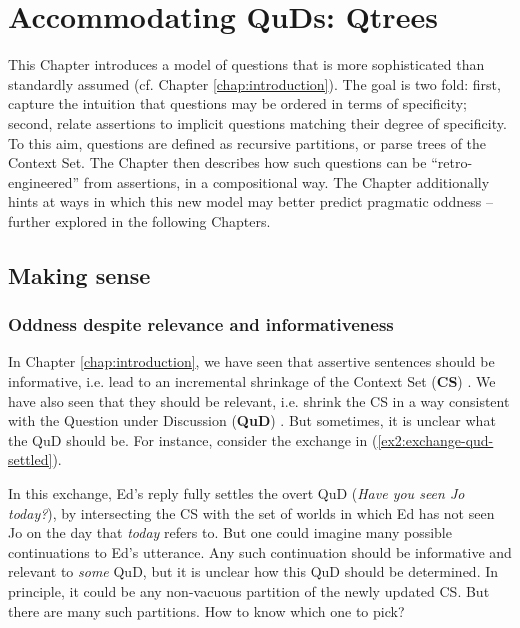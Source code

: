 \chapter{Accommodating QuDs: Qtrees}\label{chap:accommodating-quds}

This Chapter introduces a model of questions that is more sophisticated than standardly assumed (cf. Chapter \ref{chap:introduction}). The goal is two fold: first, capture the intuition that questions may be ordered in terms of specificity; second, relate assertions to implicit questions matching their degree of specificity. To this aim, questions are defined as recursive partitions, or parse trees of the Context Set. The Chapter then describes how such questions can be ``retro-engineered'' from assertions, in a compositional way. The Chapter additionally hints at ways in which this new model may better predict pragmatic oddness -- further explored in the following Chapters.


\section{Making sense}

\subsection{Oddness despite relevance and informativeness}
In Chapter \ref{chap:introduction}, we have seen that assertive sentences should be informative, i.e. lead to an incremental shrinkage of the Context Set (\textbf{CS}) \citep{Stalnaker1978,Heim1982}. We have also seen that they should be relevant, i.e. shrink the CS in a way consistent with the Question under Discussion (\textbf{QuD}) \citep{Lewis1988,Roberts2012}. But sometimes, it is unclear what the QuD should be. For instance, consider the exchange in (\ref{ex2:exchange-qud-settled}).

\begin{exe}
	\label{ex2:exchange-qud-settled}
\end{exe}

In this exchange, Ed's reply fully settles the overt QuD (\textit{Have you seen Jo today?}), by intersecting the CS with the set of worlds in which Ed has not seen Jo on the day that \textit{today} refers to. But one could imagine many possible continuations to Ed's utterance. Any such continuation should be informative and relevant to \textit{some} QuD, but it is unclear how this QuD should be determined. In principle, it could be any non-vacuous partition of the newly updated CS. But there are many such partitions. How to know which one to pick?

